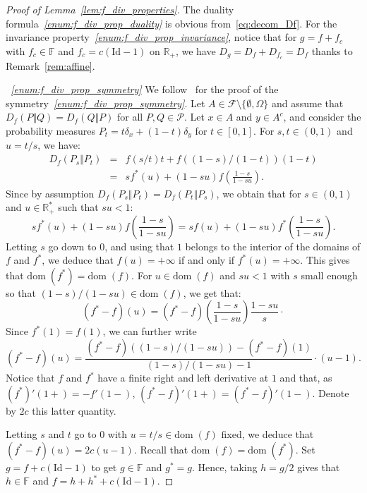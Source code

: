 \documentclass[12pt]{article}
\newcommand{\cf}{{\mathcal F}}
\newcommand{\cp}{{\mathcal P}}
\newcommand{\F}{{\mathbb F}}
\newcommand{\R}{{\mathbb R}}
\newcommand{\dom}{{\mathrm{dom}}\;}
\newcommand{\id}{\mathrm{Id}}
\theoremstyle{plain}
\theoremstyle{remark}
\begin{document}
\begin{proof}[Proof of Lemma~\ref{lem:f_div_properties}]
\medskip

The    duality    formula{\it ~\ref{enum:f_div_prop_duality}}  is    obvious
from~\eqref{eq:decom_Df}.  For    the  invariance
property{\it ~\ref{enum:f_div_prop_invariance}}, notice  that for $g=  f+ f_c$
with   $f_c\in  \F$   and  $f_c=c   (\id   -1)$  on   $\R_+$,  we   have
$D_g=D_f+ D_{f_c}=D_f$ thanks to Remark~\ref{rem:affine}.

\medskip

{\it ~\ref{enum:f_div_prop_symmetry}} We   follow~\cite{osterreicher2002csiszar}   for   the  proof   of   the
symmetry{\it ~\ref{enum:f_div_prop_symmetry}}.                             Let
$A\in    \cf\setminus\{\emptyset,    \Omega\}$     and    assume    that
$  D_f(P \Vert  Q) =  D_{f}(Q  \Vert P)  $  for all  $P,Q\in \cp$.   Let
$x\in  A$  and  $y\in  A^c$,   and  consider  the  probability  measures
$P_t=t \delta_x +  (1-t)\delta_y$ for $t\in [0, 1]$.  For $s,t\in (0,1)$
and $u=t/s$, we have:
\begin{eqnarray}
   \label{eq:Df=B(s,t)}
   D_f(P_s \Vert P_t) &=& f(s/t) t + f((1-s)/(1-t)) (1-t) \nonumber \\
   &=& s f^*(u)+ (1-su) f \left( \frac{1-s}{1-su}\right).
 \end{eqnarray}
 Since  by assumption
 $  D_f(P_s \Vert P_t)=   D_f(P_t \Vert P_s)$,
we obtain that for $s\in (0, 1)$ and $u\in \R^*_+$ such that $su<1$:
 \[
   s f^*(u)+ (1-su) f \left( \frac{1-s}{1-su}\right)
   =  s f(u)+ (1-su) f^* \left( \frac{1-s}{1-su}\right).
 \]
 Letting $s$ go down to $0$, and using that $1$ belongs to the
 interior of the domains of $f$ and $f^*$, we deduce that $f(u)=+\infty
 $ if and only if $f^*(u)=+\infty $. This gives that
 $\dom(f^*)=\dom(f)$.
 For $u\in \dom(f)$ and $su<1$ with $s$ small enough so that
 $(1-s)/(1-su)\in \dom(f)$, we get that:
 \[
   (f^*-f)(u)=(f^* -f) \left( \frac{1-s}{1-su}\right)
   \frac{1-su}{s}\cdot
 \]
Since $f^*(1) = f(1)$, we can further write
 \[
   (f^*-f)(u)= \frac{(f^*-f)((1-s)/(1-su)) - (f^*-f)(1)}{(1-s)/(1-su) - 1 }\cdot (u-1).
\] 
Notice that $f$ and  $f^*$ have a finite right and left  derivative at $1$ and
 that,  as $(f^*)'(1+)=-f'(1-)$,  $(f^*-f)'(1+)= (f^* -f)'(1-)$. Denote
 by $2c$ this latter quantity. %

 Letting
 $s$ and $t$ go to $0$ with  $u=t/s\in \dom(f)$ fixed, we deduce that
 $ (f^*-f)(u)=2c(u-1)$. Recall that $\dom(f)=\dom(f^*)$. Set $g=f + c(\id-1)$ to get  $g\in \F$ and
 $g^*=g$. Hence, taking $h=g/2$ gives that $h\in \F$ and
 $f=h+h^* + c(\id-1)$. 
 

\end{proof}
\end{document}
